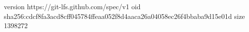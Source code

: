 version https://git-lfs.github.com/spec/v1
oid sha256:cdcf8fa3acd8cff045784ffeaa052f8d4aaca26a04058ec26f4bbaba9d15e01d
size 1398272
